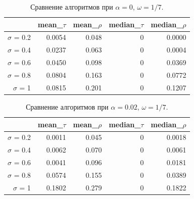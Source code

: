 \documentclass[specialist,
               substylefile = spbu.rtx,
               subf,href,colorlinks=true, 12pt]{disser}
\begin{document}
{{\begin{table}[hhh!]
\centering
\caption{Сравнение алгоритмов при $\alpha = 0$, $\omega = 1/7$.}
\begin{tabular}{rrrrr}
  \hline
 & mean\_$\tau$ & mean\_$\rho$ & median\_$\tau$ & median\_$\rho$ \\ 
  \hline
  $\sigma$ = 0.2 & 0.0054 & 0.048 & 0 & 0.0000 \\ 
  $\sigma$ = 0.4 & 0.0237 & 0.063 & 0 & 0.0004 \\ 
  $\sigma$ = 0.6 & 0.0450 & 0.098 & 0 & 0.0369 \\ 
  $\sigma$ = 0.8 & 0.0804 & 0.163 & 0 & 0.0772 \\ 
  $\sigma$ = 1 & 0.0815 & 0.201 & 0 & 0.1207 \\ 
   \hline
\end{tabular}
\label{tab:comp_tau1_pgram}
\end{table}

\begin{table}[hhh!]
\centering
\caption{Сравнение алгоритмов при $\alpha = 0.02$, $\omega = 1/7$.}
\begin{tabular}{rrrrr}
  \hline
 & mean\_$\tau$ & mean\_$\rho$ & median\_$\tau$ & median\_$\rho$ \\ 
  \hline
$\sigma$ = 0.2 & 0.0011 & 0.045 & 0 & 0.0018 \\ 
  $\sigma$ = 0.4 & 0.0062 & 0.070 & 0 & 0.0061 \\ 
  $\sigma$ = 0.6 & 0.0041 & 0.096 & 0 & 0.0181 \\ 
  $\sigma$ = 0.8 & 0.0574 & 0.155 & 0 & 0.0389 \\ 
  $\sigma$ = 1 & 0.1802 & 0.279 & 0 & 0.1822 \\
   \hline
\end{tabular}
\label{tab:comp_tau1_pgram2}
\end{table}

}}
\end{document}
